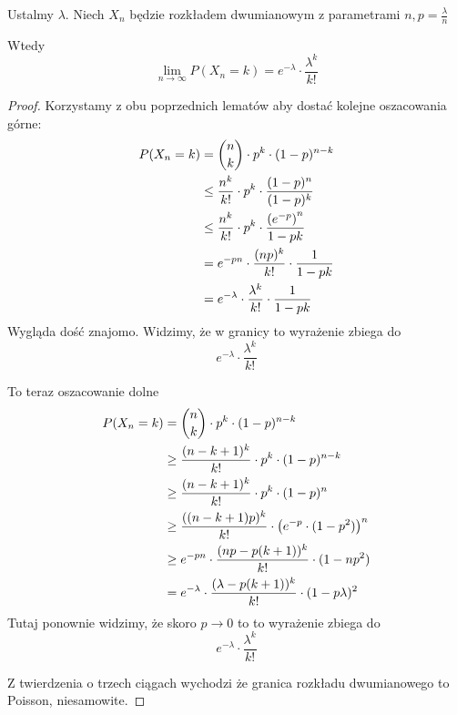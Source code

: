 \begin{theorem}[Twierdzenie 5.5 P\&C]
    Ustalmy \( \lambda \).
    Niech \( X_n \) będzie rozkładem dwumianowym z parametrami \( n,  p = \frac{\lambda}{n} \)
    
    Wtedy
    \[
        \lim_{n \rightarrow \infty} P(X_n = k) = e^{-\lambda} \cdot \frac{\lambda^k}{k!}
    \]
\end{theorem}
\begin{proof}
    Korzystamy z obu poprzednich lematów aby dostać kolejne oszacowania górne:
    \begin{align*}
        P(X_n = k) 
            &= \binom{n}{k} \cdot p^k \cdot (1-p)^{n-k} \\
            &\leq \frac{n^k}{k!} \cdot p^k \cdot \frac{(1-p)^n}{(1-p)^k} \\
            &\leq \frac{n^k}{k!} \cdot p^k \cdot \frac{\left(e^{-p}\right)^n}{1 - pk} \\
            &=e^{-pn}\cdot\frac{(np)^k}{k!}\cdot\frac{1}{1 - pk} \\
            &=e^{-\lambda} \cdot \frac{\lambda^k}{k!} \cdot \frac{1}{1 - pk}
    \end{align*}
    Wygląda dość znajomo. Widzimy, że w granicy to wyrażenie zbiega do
    \[
        e^{-\lambda} \cdot \frac{\lambda^k}{k!}
    \]
    
    To teraz oszacowanie dolne
    \begin{align*}
        P(X_n = k)
            &= \binom{n}{k} \cdot p^k \cdot (1-p)^{n-k} \\
            &\geq \frac{(n - k + 1)^k}{k!} \cdot p^k \cdot (1-p)^{n - k} \\
            &\geq \frac{(n - k + 1)^k}{k!} \cdot p^k \cdot (1-p)^n \\
            &\geq \frac{((n-k+1)p)^k}{k!} \cdot \left(e^{-p}\cdot(1 - p^2)\right)^n \\
            &\geq e^{-pn} \cdot \frac{(np - p(k+1))^k}{k!} \cdot (1 - np^2) \\
            &= e^{-\lambda} \cdot \frac{(\lambda - p(k + 1))^k}{k!} \cdot (1 - p\lambda)^2
    \end{align*}
    Tutaj ponownie widzimy, że skoro \( p \rightarrow 0 \) to to wyrażenie zbiega do
    \[
        e^{-\lambda} \cdot \frac{\lambda^k}{k!}
    \]
    
    Z twierdzenia o trzech ciągach wychodzi że granica rozkładu dwumianowego to Poisson, niesamowite.
\end{proof}